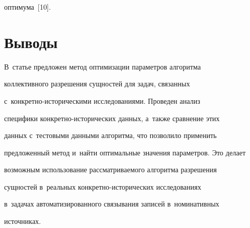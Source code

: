 оптимума~[10].





\vspace{-3pt}





\section{Выводы}





\vspace{-3pt}





  В~статье предложен метод оптимизации па\-ра\-мет\-ров алгоритма 


коллективного разрешения сущностей для задач, связанных  


с~кон\-крет\-но-ис\-то\-ри\-че\-ски\-ми исследованиями. Проведен анализ 


специфики кон\-крет\-но-ис\-то\-ри\-че\-ских данных, а~также сравнение этих 


данных с~тестовыми данными алгоритма, что позволило применить 


предложенный метод и~найти оптимальные значения параметров. Это делает 


возможным использование рас\-смат\-ри\-ва\-емо\-го алгоритма раз\-ре\-ше\-ния 


сущностей в~реальных кон\-крет\-но-ис\-то\-ри\-че\-ских исследованиях 


в~задачах автоматизированного связывания записей в~номинативных 


источниках. 





\vspace{-3pt}


  


